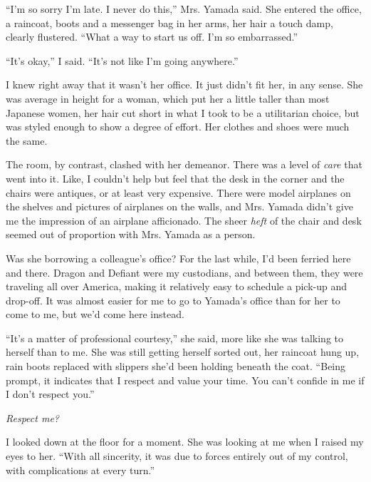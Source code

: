 





``I'm so sorry I'm late.  I never do this,'' Mrs. Yamada said.  She entered the office, a raincoat, boots and a messenger bag in her arms, her hair a touch damp, clearly flustered.  ``What a way to start us off.  I'm so embarrassed.''



``It's okay,'' I said.  ``It's not like I'm going anywhere.''



I knew right away that it wasn't her office.  It just didn't fit her, in any sense.  She was average in height for a woman, which put her a little taller than most Japanese women, her hair cut short in what I took to be a utilitarian choice, but was styled enough to show a degree of effort.  Her clothes and shoes were much the same.



The room, by contrast, clashed with her demeanor.  There was a level of \emph{care }that went into it.  Like, I couldn't help but feel that the desk in the corner and the chairs were antiques, or at least very expensive.  There were model airplanes on the shelves and pictures of airplanes on the walls, and Mrs. Yamada didn't give me the impression of an airplane afficionado.  The sheer \emph{heft} of the chair and desk seemed out of proportion with Mrs. Yamada as a person.



Was she borrowing a colleague's office?  For the last while, I'd been ferried here and there.  Dragon and Defiant were my custodians, and between them, they were traveling all over America, making it relatively easy to schedule a pick-up and drop-off.  It was almost easier for me to go to Yamada's office than for her to come to me, but we'd come here instead.



``It's a matter of professional courtesy,'' she said, more like she was talking to herself than to me.  She was still getting herself sorted out, her raincoat hung up, rain boots replaced with slippers she'd been holding beneath the coat.  ``Being prompt, it indicates that I respect and value your time.  You can't confide in me if I don't respect you.''



\emph{Respect me?}



I looked down at the floor for a moment.  She was looking at me when I raised my eyes to her.  ``With all sincerity, it was due to forces entirely out of my control, with complications at every turn.''



